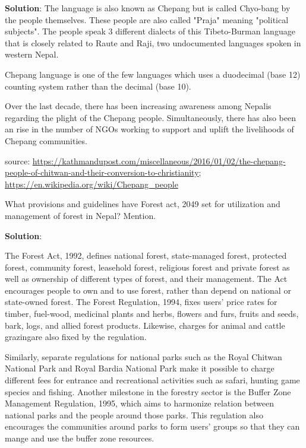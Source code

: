 \documentclass[
  openany]{book}
\newcommand{\question}{\item}
\newenvironment{solution}{ {\bfseries Solution}:}{}
\begin{document}
\begin{questions}
\begin{solution}
The language is also known as Chepang but is called Chyo-bang by the people themselves. These people are also called "Praja" meaning "political subjects". The people speak 3 different dialects of this Tibeto-Burman language that is closely related to Raute and Raji, two undocumented languages spoken in western Nepal.

Chepang language is one of the few languages which uses a duodecimal (base 12) counting system rather than the decimal (base 10). 

Over the last decade, there has been increasing awareness among Nepalis regarding the plight of the Chepang people. Simultaneously, there has also been an rise in the number of NGOs working to support and uplift the livelihoods of Chepang communities.


source: \url{https://kathmandupost.com/miscellaneous/2016/01/02/the-chepang-people-of-chitwan-and-their-conversion-to-christianity}; \url{https://en.wikipedia.org/wiki/Chepang_people}
\end{solution}

\question What provisions and guidelines have Forest act, 2049 set for utilization and management of forest in Nepal? Mention.

\begin{solution}

The Forest Act, 1992, defines national forest, state-managed forest, protected forest, community forest, leasehold forest, religious forest and private forest as well as ownership of different types of forest, and their management. The Act encourages people to own and to use forest, rather than depend on national or state-owned forest. The Forest Regulation, 1994, fixes users' price rates for timber, fuel-wood, medicinal plants and herbs, flowers and furs, fruits and seeds, bark, logs, and allied forest products. Likewise, charges for animal and cattle grazingare also fixed by the regulation.

Similarly, separate regulations for national parks such as the Royal Chitwan National Park and Royal Bardia National Park make it possible to charge different fees for entrance and recreational activities such as safari, hunting game species and fishing. Another milestone in the forestry sector is the Buffer Zone Management Regulation, 1995, which aims to harmonize relation between national parks and the people around those parks. This regulation also encourages the communities around parks to form users' groups so that they can mange and use the buffer zone resources.


\end{solution}
\end{questions}
\end{document}
